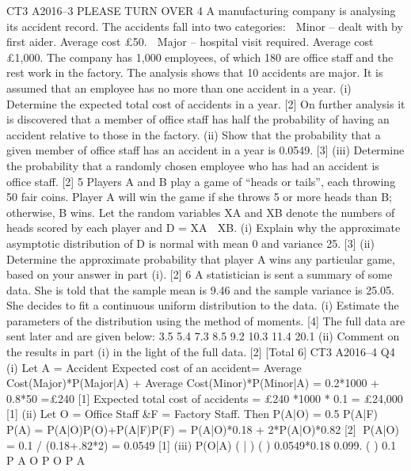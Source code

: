 \documentclass[a4paper,12pt]{article}
\begin{document}
\begin{enumerate}

CT3 A2016–3 PLEASE TURN OVER
4 A manufacturing company is analysing its accident record. The accidents fall into
two categories:
   Minor – dealt with by first aider. Average cost £50.
 Major – hospital visit required. Average cost £1,000.
The company has 1,000 employees, of which 180 are office staff and the rest work in
the factory.
The analysis shows that 10%
accidents are major. It is assumed that an employee has no more than one accident in
a year.
(i) Determine the expected total cost of accidents in a year. [2]
On further analysis it is discovered that a member of office staff has half the
probability of having an accident relative to those in the factory.
(ii) Show that the probability that a given member of office staff has an accident
in a year is 0.0549. [3]
(iii) Determine the probability that a randomly chosen employee who has had an
accident is office staff. [2]
  5 Players A and B play a game of “heads or tails”, each throwing 50 fair coins. Player
A will win the game if she throws 5 or more heads than B; otherwise, B wins. Let the
random variables XA and XB denote the numbers of heads scored by each player and
D = XA  XB.
(i) Explain why the approximate asymptotic distribution of D is normal with
mean 0 and variance 25. [3]
(ii) Determine the approximate probability that player A wins any particular
game, based on your answer in part (i). [2]
6 A statistician is sent a summary of some data. She is told that the sample mean is
9.46 and the sample variance is 25.05. She decides to fit a continuous uniform
distribution to the data.
(i) Estimate the parameters of the distribution using the method of moments. [4]
The full data are sent later and are given below:
  3.5 5.4 7.3 8.5 9.2 10.3 11.4 20.1
(ii) Comment on the results in part (i) in the light of the full data. [2]
[Total 6]
CT3 A2016–4
Q4 (i) Let A = Accident
Expected cost of an accident= Average Cost(Major)*P(Major|A)
+ Average Cost(Minor)*P(Minor|A)
= 0.2*1000 + 0.8*50 =£240 [1]
Expected total cost of accidents = £240 *1000 * 0.1 = £24,000 [1]
(ii) Let O = Office Staff &F = Factory Staff. Then P(A|O) = 0.5 P(A|F)
P(A) = P(A|O)P(O)+P(A|F)P(F) = P(A|O)*0.18 + 2*P(A|O)*0.82 [2]
P(A|O) = 0.1 / (0.18+.82*2) = 0.0549 [1]
(iii) P(O|A) ( | ) ( ) 0.0549*0.18 0.099.
( ) 0.1
P A O P O
P A

\end{enumerate}
\end{document}
